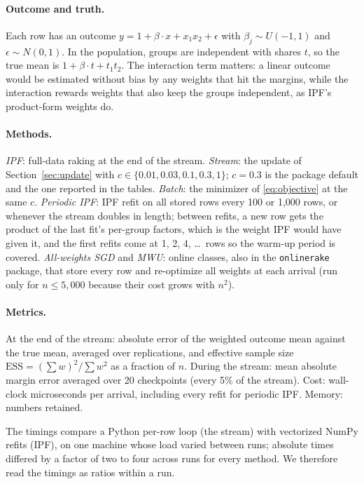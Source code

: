 \documentclass[12pt, letterpaper]{article}
\begin{document}
\paragraph{Outcome and truth.} Each row has an outcome $y = 1 + \beta \cdot x + x_1 x_2 + \epsilon$ with $\beta_j \sim U(-1,1)$ and $\epsilon \sim N(0,1)$. In the population, groups are independent with shares $t$, so the true mean is $1 + \beta \cdot t + t_1 t_2$. The interaction term matters: a linear outcome would be estimated without bias by any weights that hit the margins, while the interaction rewards weights that also keep the groups independent, as IPF's product-form weights do.

\paragraph{Methods.} \emph{IPF}: full-data raking at the end of the stream. \emph{Stream}: the update of Section~\ref{sec:update} with $c \in \{0.01, 0.03, 0.1, 0.3, 1\}$; $c = 0.3$ is the package default and the one reported in the tables. \emph{Batch}: the minimizer of \eqref{eq:objective} at the same $c$. \emph{Periodic IPF}: IPF refit on all stored rows every 100 or 1,000 rows, or whenever the stream doubles in length; between refits, a new row gets the product of the last fit's per-group factors, which is the weight IPF would have given it, and the first refits come at 1, 2, 4, \dots\ rows so the warm-up period is covered. \emph{All-weights SGD} and \emph{MWU}: online classes, also in the \texttt{onlinerake} package, that store every row and re-optimize all weights at each arrival (run only for $n \le 5{,}000$ because their cost grows with $n^2$).

\paragraph{Metrics.} At the end of the stream: absolute error of the weighted outcome mean against the true mean, averaged over replications, and effective sample size $\text{ESS} = (\sum w)^2 / \sum w^2$ as a fraction of $n$. During the stream: mean absolute margin error averaged over 20 checkpoints (every 5\% of the stream). Cost: wall-clock microseconds per arrival, including every refit for periodic IPF. Memory: numbers retained.

The timings compare a Python per-row loop (the stream) with vectorized NumPy refits (IPF), on one machine whose load varied between runs; absolute times differed by a factor of two to four across runs for every method. We therefore read the timings as ratios within a run.
\end{document}
